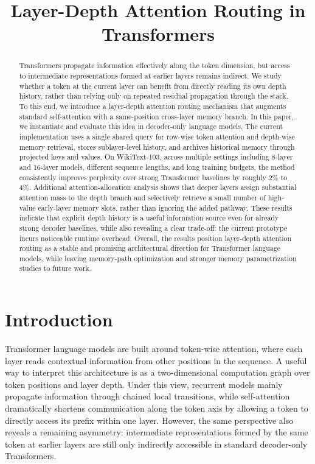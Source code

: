 \documentclass[11pt]{article}
\title{Layer-Depth Attention Routing in Transformers}
\author{}
\date{}
\begin{document}
\maketitle

\begin{abstract}
Transformers propagate information effectively along the token dimension, but access to intermediate representations formed at earlier layers remains indirect. We study whether a token at the current layer can benefit from directly reading its own depth history, rather than relying only on repeated residual propagation through the stack. To this end, we introduce a layer-depth attention routing mechanism that augments standard self-attention with a same-position cross-layer memory branch. In this paper, we instantiate and evaluate this idea in decoder-only language models. The current implementation uses a single shared query for row-wise token attention and depth-wise memory retrieval, stores sublayer-level history, and archives historical memory through projected keys and values. On WikiText-103, across multiple settings including 8-layer and 16-layer models, different sequence lengths, and long training budgets, the method consistently improves perplexity over strong Transformer baselines by roughly 2\% to 4\%. Additional attention-allocation analysis shows that deeper layers assign substantial attention mass to the depth branch and selectively retrieve a small number of high-value early-layer memory slots, rather than ignoring the added pathway. These results indicate that explicit depth history is a useful information source even for already strong decoder baselines, while also revealing a clear trade-off: the current prototype incurs noticeable runtime overhead. Overall, the results position layer-depth attention routing as a stable and promising architectural direction for Transformer language models, while leaving memory-path optimization and stronger memory parametrization studies to future work.
\end{abstract}

\section{Introduction}

Transformer language models are built around token-wise attention, where each layer reads contextual information from other positions in the sequence. A useful way to interpret this architecture is as a two-dimensional computation graph over token positions and layer depth. Under this view, recurrent models mainly propagate information through chained local transitions, while self-attention dramatically shortens communication along the token axis by allowing a token to directly access its prefix within one layer. However, the same perspective also reveals a remaining asymmetry: intermediate representations formed by the same token at earlier layers are still only indirectly accessible in standard decoder-only Transformers.
\end{document}
